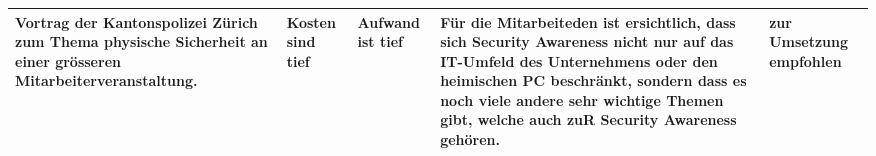 \documentclass[../../main.tex]{subfiles}
\begin{document}
\begin{table}[H]
\begin{tabular}{ |p{3.8cm}|p{2.5cm}|p{2.5cm}|p{3.8cm}|p{3.0cm}|}
\hline
Vortrag der Kantonspolizei Zürich zum Thema physische Sicherheit an einer grösseren Mitarbeiterveranstaltung.  &  Kosten sind tief &  Aufwand ist tief  & Für die Mitarbeiteden ist ersichtlich, dass sich Security Awareness nicht nur auf das IT-Umfeld des Unternehmens oder den heimischen PC beschränkt, sondern dass es noch viele andere sehr wichtige Themen gibt, welche auch zuR Security Awareness gehören.  & zur Umsetzung empfohlen\\
\hline

\end{tabular}
\end{table}
\end{document}
